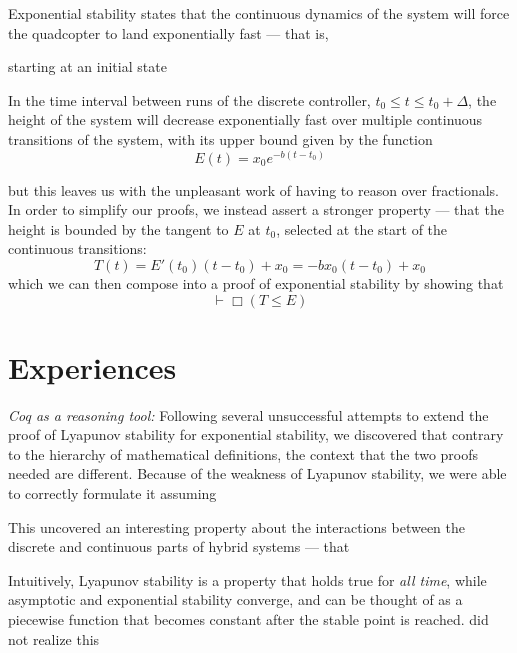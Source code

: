 \documentclass{sigplanconf}
\begin{document}




Exponential stability states that the continuous dynamics of the system will force the quadcopter to land exponentially fast --- that is,

starting at an initial state

In the time interval between runs of the discrete controller, $t_0\leq t \leq t_0+\Delta$, the height of the system will decrease exponentially fast over multiple continuous transitions of the system, with its upper bound given by the function \[E(t)=x_0e^{-b(t-t_0)}\]

but this leaves us with the unpleasant work of having to reason over fractionals. In order to simplify our proofs, we instead assert a stronger property --- that the height is bounded by the tangent to $E$ at $t_0$, selected at the start of the continuous transitions:
\[T(t) = E'(t_0)(t-t_0)+x_0 = -bx_0(t-t_0)+x_0\]
which we can then compose into a proof of exponential stability by showing that
\[ \vdash \Box (T\leq E) \]



\section {Experiences}

\emph{Coq as a reasoning tool: } Following several unsuccessful attempts to extend the proof of Lyapunov stability for exponential stability, we discovered that contrary to the hierarchy of mathematical definitions, the context that the two proofs needed are different. Because of the weakness of Lyapunov stability, we were able to correctly formulate it assuming


This uncovered an interesting property about the interactions between the discrete and continuous parts of hybrid systems --- that

 Intuitively, Lyapunov stability is a property that holds true for \emph{all time}, while asymptotic and exponential stability converge, and can be thought of as a piecewise function that becomes constant after the stable point is reached. did not realize this
\end{document}
